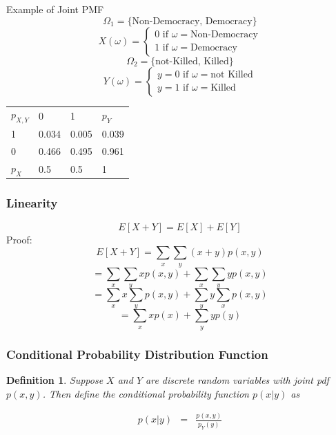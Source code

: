 \documentclass{beamer}
\newtheorem{defn}{Definition}
\numberwithin{equation}{section}
\begin{document}
\begin{frame}{Example of Joint PMF}
$$\Omega_1=\{\text{Non-Democracy, \ \ Democracy}\}$$
$$X(\omega)=\begin{cases}
 0\text{ if $\omega=$Non-Democracy}\\
1\text{ if $\omega=$Democracy}
\end{cases}$$
\pause
$$\Omega_2=\{\text{not-Killed, \ \ Killed}\}$$
$$Y(\omega)=\begin{cases}
y= 0\text{ if $\omega=$not Killed}\\
y=1\text{ if $\omega=$Killed}
\end{cases}$$

\pause
\begin{table}
\begin{tabular}{lll|l}
		$p_{X,Y}$& 0& 1&$p_{Y}$\\
1 & 0.034& 0.005& 0.039\\
0 & 0.466 &0.495&  0.961\\
\hline
$p_{X}$& 0.5 &0.5&  1
\end{tabular}
\end{table}
\end{frame}


\begin{frame}
\frametitle{Linearity}
$$E[X+Y]=E[X]+E[Y]$$
Proof:
$$E[X+Y] = \sum_{x} \sum_{y} (x+y) p(x, y) $$  \pause 
$$=  \sum_{x} \sum_{y} x p(x, y )+ \sum_{x} \sum_{y} y p(x, y) $$  \pause 
$$=  \sum_{x} x \sum_{y} p(x, y )+  \sum_{y} y \sum_{x} p(x, y) $$  \pause 
$$=  \sum_{x} x p(x )+  \sum_{y} y p( y) $$  \pause 

\end{frame}



\begin{frame}
\frametitle{Conditional Probability Distribution Function}


\begin{defn}
Suppose $X$ and $Y$ are discrete random variables with joint pdf $p(x,y)$.  Then define the \alert{conditional probability function} $p(x|y)$ as 

\begin{eqnarray}
p(x|y) & = & \frac{p(x, y) }{p_{Y}(y) } \nonumber 
\end{eqnarray}

\end{defn}

\end{frame}
\end{document}
